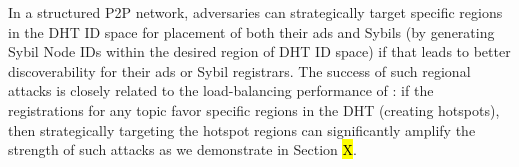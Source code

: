 
In a structured P2P network, adversaries can strategically target specific regions in the DHT ID space for placement of both their ads and Sybils (\ie by generating Sybil Node IDs within the desired region of DHT ID space) if that leads to better discoverability for their ads or Sybil registrars. The success of such regional attacks is closely related to the load-balancing performance of \sysname: if the registrations for any topic favor specific regions in the DHT (\ie creating hotspots), then strategically targeting the hotspot regions can significantly amplify the strength of such attacks as we demonstrate in Section \hl{X}.





